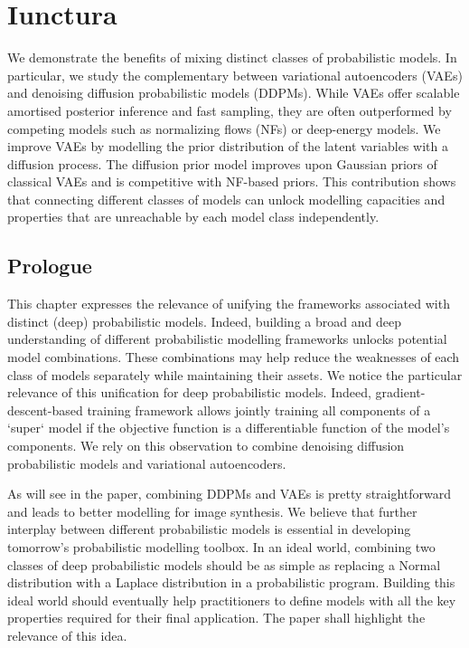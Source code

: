 \chapter{Iunctura}\label{ch:03}

\begin{chapter_outline}

  We demonstrate the benefits of mixing distinct classes of probabilistic models. In particular, we study the complementary between variational autoencoders (VAEs) and denoising diffusion probabilistic models (DDPMs). While VAEs offer scalable amortised posterior inference and fast sampling, they are often outperformed by competing models such as normalizing flows (NFs) or deep-energy models. We improve VAEs by modelling the prior distribution of the latent variables with a diffusion process. The diffusion prior model improves upon Gaussian priors of classical VAEs and is competitive with NF-based priors.
  This contribution shows that connecting different classes of models can unlock modelling capacities and properties that are unreachable by each model class independently.
\end{chapter_outline}
\section{Prologue}
This chapter expresses the relevance of unifying the frameworks associated with distinct (deep) probabilistic models. Indeed, building a broad and deep understanding of different probabilistic modelling frameworks unlocks potential model combinations. These combinations may help reduce the weaknesses of each class of models separately while maintaining their assets. We notice the particular relevance of this unification for deep probabilistic models. Indeed, gradient-descent-based training framework allows jointly training all components of a `super` model if the objective function is a differentiable function of the model's components. We rely on this observation to combine denoising diffusion probabilistic models and variational autoencoders.

As will see in the paper, combining DDPMs and VAEs is pretty straightforward and leads to better modelling for image synthesis. We believe that further interplay between different probabilistic models is essential in developing tomorrow's probabilistic modelling toolbox. In an ideal world, combining two classes of deep probabilistic models should be as simple as replacing a Normal distribution with a Laplace distribution in a probabilistic program. Building this ideal world should eventually help practitioners to define models with all the key properties required for their final application. The paper shall highlight the relevance of this idea.


